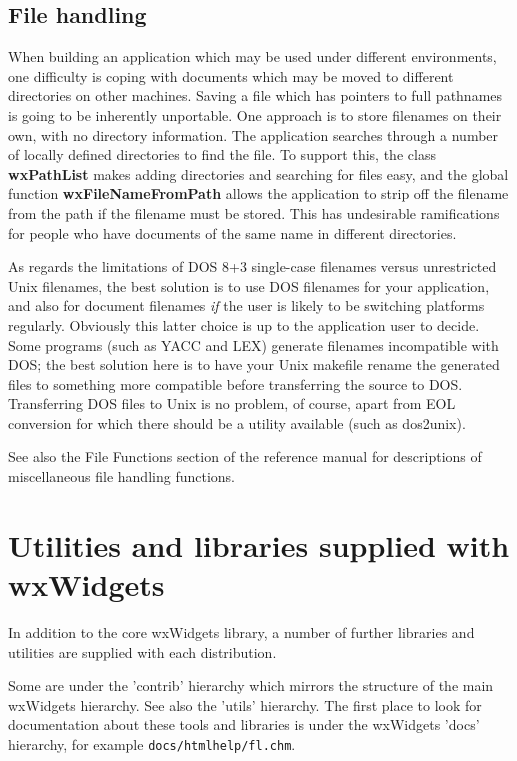 \section{File handling}

When building an application which may be used under different
environments, one difficulty is coping with documents which may be
moved to different directories on other machines. Saving a file which
has pointers to full pathnames is going to be inherently unportable. One
approach is to store filenames on their own, with no directory
information.  The application searches through a number of locally
defined directories to find the file. To support this, the class {\bf
wxPathList} makes adding directories and searching for files easy, and
the global function {\bf wxFileNameFromPath} allows the application to
strip off the filename from the path if the filename must be stored.
This has undesirable ramifications for people who have documents of the
same name in different directories.

As regards the limitations of DOS 8+3 single-case filenames versus
unrestricted Unix filenames, the best solution is to use DOS filenames
for your application, and also for document filenames {\it if} the user
is likely to be switching platforms regularly. Obviously this latter
choice is up to the application user to decide.  Some programs (such as
YACC and LEX) generate filenames incompatible with DOS; the best
solution here is to have your Unix makefile rename the generated files
to something more compatible before transferring the source to DOS.
Transferring DOS files to Unix is no problem, of course, apart from EOL
conversion for which there should be a utility available (such as
dos2unix).

See also the File Functions section of the reference manual for
descriptions of miscellaneous file handling functions.

\chapter{Utilities and libraries supplied with wxWidgets}\label{utilities}
%
\setfooter{\thepage}{}{}{}{}{\thepage}%

In addition to the core wxWidgets library, a number of further
libraries and utilities are supplied with each distribution.

Some are under the 'contrib' hierarchy which mirrors the
structure of the main wxWidgets hierarchy. See also the 'utils'
hierarchy. The first place to look for documentation about
these tools and libraries is under the wxWidgets 'docs' hierarchy,
for example {\tt docs/htmlhelp/fl.chm}.

